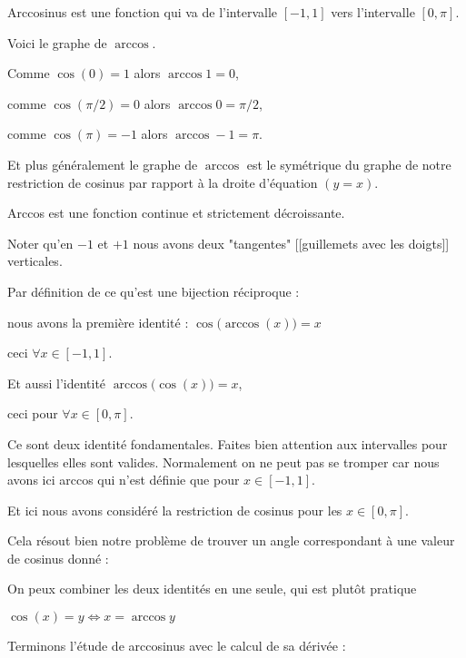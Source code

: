 Arccosinus est une fonction qui va de l'intervalle $[-1,1]$ vers l'intervalle $[0,\pi]$.

\change


Voici le graphe de $\arccos$.

Comme $\cos(0)=1$ alors $\arccos 1 = 0$,

comme $\cos(\pi/2)=0$ alors $\arccos 0 = \pi/2$,

comme $\cos(\pi)=-1$ alors $\arccos -1 = \pi$.

Et plus généralement le graphe de $\arccos$ est le symétrique du graphe de notre restriction de cosinus
par rapport à la droite d'équation $(y=x)$.

Arccos est une fonction continue et strictement décroissante.

Noter qu'en $-1$ et $+1$ nous avons deux "tangentes" [[guillemets avec les doigts]] verticales.

\diapo


Par définition de ce qu'est une bijection réciproque :

nous avons la première identité : 
$\cos\big(\arccos(x)\big) = x$

ceci $\forall x \in [-1,1]$.


\change

Et aussi l'identité 
$\arccos\big(\cos(x)\big) = x$,

ceci pour $\forall x \in [0,\pi]$.

\change

Ce sont deux identité fondamentales.
Faites bien attention aux intervalles pour lesquelles elles sont valides.
Normalement on ne peut pas se tromper car nous avons ici arccos qui n'est définie
que pour $x \in [-1,1]$.

Et ici nous avons considéré la restriction de cosinus pour les  $x \in [0,\pi]$.

\change

Cela résout bien notre problème de trouver un angle correspondant à une valeur de cosinus donné :

On peux combiner les deux identités en une seule, qui est plutôt pratique

$\cos(x)=y \iff x = \arccos y$



\diapo

Terminons l'étude de arccosinus avec le calcul de sa dérivée :


